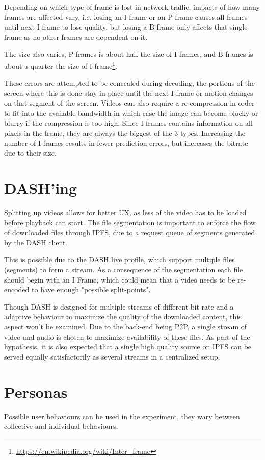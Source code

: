 Depending on which type of frame is lost in network traffic, impacts of how many frames are affected vary, i.e. losing an \ac{I-frame} or an \ac{P-frame} causes all frames until next \ac{I-frame} to lose quality, but losing a \ac{B-frame} only affects that single frame as no other frames are dependent on it.

The size also varies, \acp{P-frame} is about half the size of \acp{I-frame}, and \acp{B-frame} is about a quarter the size of \ac{I-frame}\footnote{\url{https://en.wikipedia.org/wiki/Inter_frame}}.

These errors are attempted to be concealed during decoding, the portions of the screen where this is done stay in place until the next \ac{I-frame} or motion changes on that segment of the screen. Videos can also require a re-compression in order to fit into the available bandwidth in which case the image can become blocky or blurry if the compression is too high.
Since \acp{I-frame} contains information on all pixels in the frame, they are always the biggest of the 3 types. Increasing the number of \acp{I-frame} results in fewer prediction errors, but increases the bitrate due to their size.

\section{DASH'ing}
\label{sec:des-dash}
Splitting up videos allows for better \ac{UX}, as less of the video has to be loaded before playback can start. The file segmentation is important to enforce the flow of downloaded files through IPFS, due to a request queue of segments generated by the \ac{DASH} client.

This is possible due to the \ac{DASH} live profile, which support multiple files (segments) to form a stream. As a consequence of the segmentation each file should begin with an I Frame, which could mean that a video needs to be re-encoded to have enough "possible split-points".

Though \ac{DASH} is designed for multiple streams of different bit rate and a adaptive behaviour to maximize the quality of the downloaded content, this aspect won't be examined. Due to the back-end being \ac{P2P}, a single stream of video and audio is chosen to maximize availability of these files. As part of the hypothesis, it is also expected that a single high quality source on \ac{IPFS} can be served equally satisfactorily as several streams in a centralized setup.

\section{Personas}
\label{sec:des-persona}
Possible user behaviours can be used in the experiment, they wary between collective and individual behaviours.

